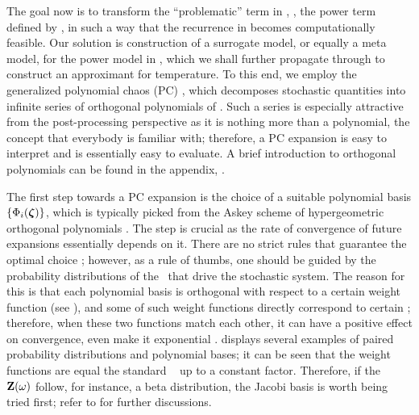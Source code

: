 The goal now is to transform the ``problematic'' term in , \ie, the power term defined by , in such a way that the recurrence in  becomes computationally feasible. Our solution is construction of a surrogate model, or equally a meta model, for the power model in , which we shall further propagate through  to construct an approximant for temperature. To this end, we employ the generalized polynomial chaos (PC) \cite{xiu2002}, which decomposes stochastic quantities into infinite series of orthogonal polynomials of \rvs. Such a series is especially attractive from the post-processing perspective as it is nothing more than a polynomial, the concept that everybody is familiar with; therefore, a PC expansion is easy to interpret and is essentially easy to evaluate. A brief introduction to orthogonal polynomials can be found in the appendix, .


The first step towards a PC expansion is the choice of a suitable polynomial basis $\{ \Phi_i(\boldsymbol{\zeta}) \}$, which is typically picked from the Askey scheme of hypergeometric orthogonal polynomials \cite{xiu2002}. The step is crucial as the rate of convergence of future expansions essentially depends on it. There are no strict rules that guarantee the optimal choice \cite{maitre2010, knio2006}; however, as a rule of thumbs, one should be guided by the probability distributions of the \rvs\ that drive the stochastic system. The reason for this is that each polynomial basis is orthogonal with respect to a certain weight function (see ), and some of such weight functions directly correspond to certain \pdfs; therefore, when these two functions match each other, it can have a positive effect on convergence, even make it exponential \cite{xiu2002}.  displays several examples of paired probability distributions and polynomial bases; it can be seen that the weight functions are equal the standard \pdfs\ \cite{durrett2010} up to a constant factor. Therefore, if the \rvs\ $\mathbf{Z}(\omega)$ follow, for instance, a beta distribution, the Jacobi basis is worth being tried first; refer to \cite{xiu2010, xiu2002} for further discussions.

